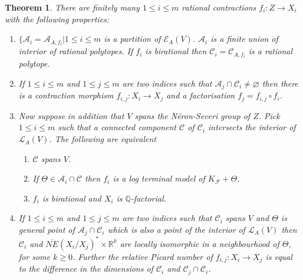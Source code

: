 \documentclass[12pt]{amsart}%
\theoremstyle{plain}
\newtheorem{theorem}{Theorem}[section]
\theoremstyle{remark}
\theoremstyle{definition}
\newcommand{\<}{\leq}
\newcommand{\mbQ}{\mathbb{Q}}
\newcommand{\mbR}{\mathbb{R}}
\theoremstyle{definition}
\theoremstyle{definition}
\numberwithin{equation}{section}
\theoremstyle{remark}
\begin{document}
\begin{theorem}\label{Lsm1}
 There are finitely many $1\leqslant i\leqslant m$ rational contractions $f_i:Z\rightarrow X_i$ with the following properties:
 \begin{enumerate}
     \item $\lbrace \mathcal{A}_i=\mathcal{A}_{A,f_i}|1\leqslant i\leqslant m$ is a partition of $\mathcal{E}_A(V)$. $\mathcal{A}_i$ is a finite union of interior of rational polytopes. If $f_i$ is birational then $\mathcal{C}_i=\mathcal{C}_{A,f_i}$ is a rational polytope. 
     \item If $1\leqslant i\leqslant m$ and $1\leqslant j\leqslant m$ are two indices such that $\mathcal{A}_j\cap \mathcal{C}_i\neq \varnothing$ then there is a contraction morphism $f_{i,j}:X_i\rightarrow X_j$ and a factorisation $f_j=f_{i,j}\circ f_i$.
     \item Now suppose in addition that $V$ spans the N\'eron-Severi group of $Z$. Pick $1\leqslant i\leqslant m$ such that a connected component $\mathcal{C}$ of $\mathcal{C}_i$ intersects the interior of $\mathcal{L}_A(V)$. The following are equivalent 
     \begin{enumerate}
         \item $\mathcal{C}$ spans $V$.
        \item If $\Theta\in \mathcal{A}_i\cap \mathcal{C}$ then $f_i$ is a log terminal model of $K_{\mathcal{F}}+\Theta$.
        \item $f_i$ is birational and $X_i$ is $\mbQ$-factorial.
        
     \end{enumerate}
     \item If $1\leqslant i\leqslant m$ and $1\leqslant j\leqslant m$ are two indices such that $\mathcal{C}_i$ spans $V$ and $\Theta$ is general point of $\mathcal{A}_j\cap \mathcal{C}_i$ which is also a point of the interior of $\mathcal{L}_A(V)$ then $\mathcal{C}_i$ and $\overline{NE}(X_i/X_j)^*\times \mbR^k$ are locally isomorphic in a neighbourhood of $\Theta$, for some $k\geqslant 0$. Further the relative Picard number of $f_{i,j}:X_i\rightarrow X_j$ is equal to the difference in the dimensions of $\mathcal{C}_i$ and $\mathcal{C}_j\cap \mathcal{C}_i$. 
     
 \end{enumerate}
\end{theorem}
\end{document}

